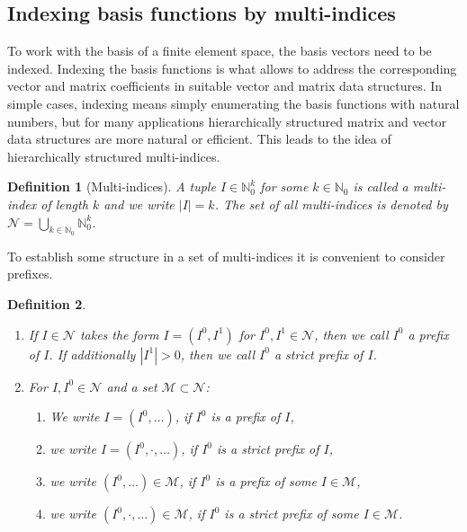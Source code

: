 \documentclass[a4paper,10pt,headings=normal,bibliography=totoc]{scrartcl}
\newtheorem{definition}{Definition}
\newcommand{\N}{\mathbb{N}}
\begin{document}
\subsection{Indexing basis functions by multi-indices}
\label{sec:index_trees}

To work with the basis of a finite element space, the basis vectors need to be indexed.  Indexing the basis functions
is what allows to address the corresponding vector and matrix coefficients in suitable vector and matrix data structures.
In simple cases, indexing means simply enumerating the basis functions with natural numbers, but for many applications
hierarchically structured matrix and vector data structures are more natural or efficient.  This leads to the idea
of hierarchically structured multi-indices.
%
\begin{definition}[Multi-indices]
 A tuple $I \in \N_0^k$ for some $k \in \N_0$ is called a multi-index of length $k$
 and we write $|I|=k$.
 The set of all multi-indices is denoted by
 $\mathcal{N} = \bigcup_{k \in \N_0} \N_0^k$.
\end{definition}
%
To establish some structure in a set of multi-indices it is convenient to consider prefixes.
%
\begin{definition}
    \begin{enumerate}
        \item
            If $I \in \mathcal{N}$ takes the form $I = (I^0,I^1)$ for $I^0,I^1 \in \mathcal{N}$,
            then we call $I^0$ a prefix of $I$.
            If additionally $|I^1|>0$, then we call $I^0$ a strict prefix of $I$.
        \item
            For $I,I^0 \in \mathcal{N}$ and a set $\mathcal{M} \subset \mathcal{N}$:
            \begin{enumerate}
              \item
                We write $I=(I^0,\dots)$, if $I^0$ is a prefix of $I$,
              \item
                we write $I=(I^0,\cdot,\dots)$, if $I^0$ is a strict prefix of $I$,
              \item
                we write $(I^0,\dots) \in \mathcal{M}$, if $I^0$ is a prefix of some
                $I \in \mathcal{M}$,
              \item
                we write $(I^0,\cdot,\dots) \in \mathcal{M}$, if $I^0$ is a strict prefix of some
                $I \in \mathcal{M}$.
            \end{enumerate}
    \end{enumerate}
\end{definition}
\end{document}
